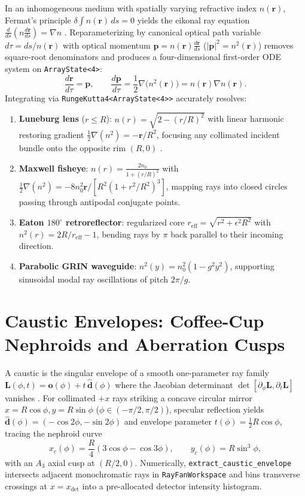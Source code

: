 \documentclass[12pt]{article}
\begin{document}
In an inhomogeneous medium with spatially varying refractive index $n(\mathbf{r})$, Fermat's principle $\delta\int n(\mathbf{r})\,ds = 0$ yields the eikonal ray equation $\frac{d}{ds}(n\frac{d\mathbf{r}}{ds}) = \nabla n$ \cite{luneburg1964mathematical}. Reparameterizing by canonical optical path variable $d\tau = ds / n(\mathbf{r})$ with optical momentum $\mathbf{p} = n(\mathbf{r})\frac{d\mathbf{r}}{ds}$ ($|\mathbf{p}|^2 = n^2(\mathbf{r})$) removes square-root denominators and produces a four-dimensional first-order ODE system on \texttt{ArrayState<4>}:
\begin{equation}
\frac{d\mathbf{r}}{d\tau} = \mathbf{p}, \qquad
\frac{d\mathbf{p}}{d\tau} = \frac{1}{2}\nabla\bigl(n^2(\mathbf{r})\bigr) = n(\mathbf{r})\nabla n(\mathbf{r}).
\end{equation}
Integrating via \texttt{RungeKutta4<ArrayState<4>>} accurately resolves:
\begin{enumerate}
\item \textbf{Luneburg lens} ($r \le R$): $n(r) = \sqrt{2 - (r/R)^2}$ with linear harmonic restoring gradient $\frac{1}{2}\nabla(n^2) = -\mathbf{r}/R^2$, focusing any collimated incident bundle onto the opposite rim $(R, 0)$ \cite{luneburg1964mathematical}.
\item \textbf{Maxwell fisheye}: $n(r) = \frac{2 n_0}{1 + (r/R)^2}$ with $\frac{1}{2}\nabla(n^2) = -8 n_0^2 \mathbf{r} / [R^2(1 + r^2/R^2)^3]$, mapping rays into closed circles passing through antipodal conjugate points.
\item \textbf{Eaton $180^\circ$ retroreflector}: regularized core $r_{\text{eff}} = \sqrt{r^2 + \epsilon^2 R^2}$ with $n^2(r) = 2R/r_{\text{eff}} - 1$, bending rays by $\pi$ back parallel to their incoming direction.
\item \textbf{Parabolic GRIN waveguide}: $n^2(y) = n_0^2(1 - g^2 y^2)$, supporting sinusoidal modal ray oscillations of pitch $2\pi / g$.
\end{enumerate}

\section{Caustic Envelopes: Coffee-Cup Nephroids and Aberration Cusps}

A caustic is the singular envelope of a smooth one-parameter ray family $\mathbf{L}(\phi, t) = \mathbf{o}(\phi) + t\,\hat{\mathbf{d}}(\phi)$ where the Jacobian determinant $\det[\partial_\phi \mathbf{L}, \partial_t \mathbf{L}]$ vanishes \cite{berry1980catastrophe}. For collimated $+x$ rays striking a concave circular mirror $x = R\cos\phi, y = R\sin\phi$ ($\phi \in (-\pi/2, \pi/2)$), specular reflection yields $\hat{\mathbf{d}}(\phi) = (-\cos 2\phi, -\sin 2\phi)$ and envelope parameter $t(\phi) = \frac{1}{2}R\cos\phi$, tracing the nephroid curve
\begin{equation}
x_c(\phi) = \frac{R}{4}(3\cos\phi - \cos 3\phi), \qquad y_c(\phi) = R\sin^3\phi,
\end{equation}
with an $A_3$ axial cusp at $(R/2, 0)$. Numerically, \texttt{extract\_caustic\_envelope} intersects adjacent monochromatic rays in \texttt{RayFanWorkspace} and bins transverse crossings at $x = x_{\text{det}}$ into a pre-allocated detector intensity histogram.
\end{document}
